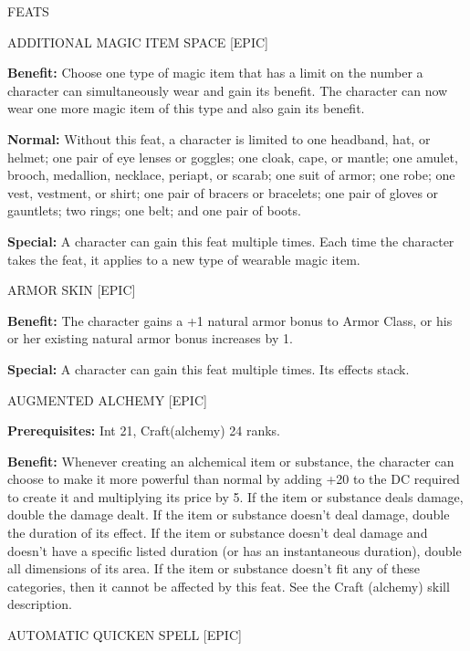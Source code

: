 \documentclass{article}
\begin{document}
\vspace{12pt}
{\LARGE{}FEATS}

\vspace{12pt}
ADDITIONAL MAGIC ITEM SPACE [EPIC] 

\textbf{Benefit:} Choose one type of magic item that has a limit on the number 
a character can simultaneously wear and gain its benefit. The character can now 
wear one more magic item of this type and also gain its benefit. 

\textbf{Normal:} Without this feat, a character is limited to one headband, hat, 
or helmet; one pair of eye lenses or goggles; one cloak, cape, or mantle; one amulet, 
brooch, medallion, necklace, periapt, or scarab; one suit of armor; one robe; one 
vest, vestment, or shirt; one pair of bracers or bracelets; one pair of gloves 
or gauntlets; two rings; one belt; and one pair of boots. 

\textbf{Special:} A character can gain this feat multiple times. Each time the 
character takes the feat, it applies to a new type of wearable magic item. 

\vspace{12pt}
ARMOR SKIN [EPIC] 

\textbf{Benefit:} The character gains a +1 natural armor bonus to Armor Class, 
or his or her existing natural armor bonus increases by 1. 

\textbf{Special:} A character can gain this feat multiple times. Its effects stack. 

\vspace{12pt}
AUGMENTED ALCHEMY [EPIC] 

\textbf{Prerequisites:} Int 21, Craft(alchemy) 24 ranks. 

\textbf{Benefit:} Whenever creating an alchemical item or substance, the character 
can choose to make it more powerful than normal by adding +20 to the DC required 
to create it and multiplying its price by 5. If the item or substance deals damage, 
double the damage dealt. If the item or substance doesn't deal damage, double the 
duration of its effect. If the item or substance doesn't deal damage and doesn't 
have a specific listed duration (or has an instantaneous duration), double all 
dimensions of its area. If the item or substance doesn't fit any of these categories, 
then it cannot be affected by this feat. See the Craft (alchemy) skill description. 

\vspace{12pt}
AUTOMATIC QUICKEN SPELL [EPIC] 
\end{document}
